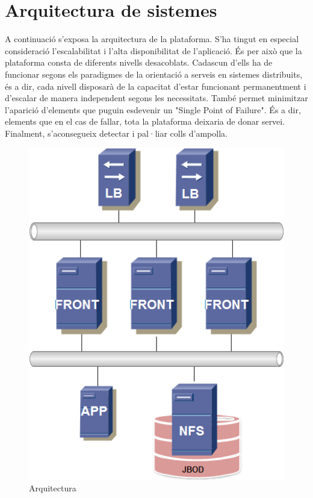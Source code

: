 \documentclass[a4paper, 11pt]{article}
\begin{document}
\section{Arquitectura de sistemes}

A continuació s'exposa la arquitectura de la plataforma. S'ha tingut en especial consideració l'escalabilitat i l'alta disponibilitat de l'aplicació. És per això que la plataforma consta de diferents nivells desacoblats. Cadascun d'ells ha de funcionar segons els paradigmes de la orientació a serveis en sistemes distribuits, és a dir, cada nivell disposarà de la capacitat d'estar funcionant permanentment i d'escalar de manera independent segons les necessitats. 
També permet minimitzar l'aparició d'elements que puguin esdevenir un "Single Point of Failure". És a dir, elements que en el cas de fallar, tota la plataforma deixaria de donar servei. Finalment, s’aconsegueix detectar i pal·liar colls d'ampolla.

\begin{figure}[H]
    \centering
    \includegraphics[width=1.0\textwidth]{IM}
    \caption{Arquitectura \label{fig:centralized}}    
\end{figure}
\end{document}
